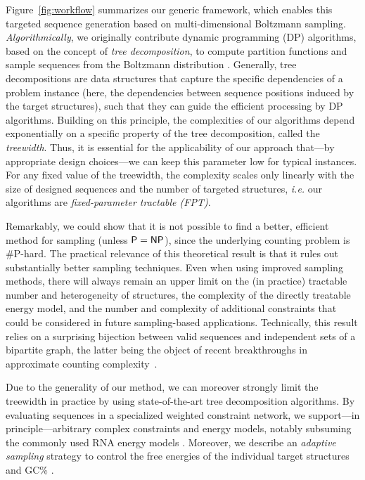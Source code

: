 \documentclass[]{bmcart}
\newcommand{\Def}[1]{\emph{#1}}
\newcommand{\Nuc}[1]{{\sf #1}}
\newcommand{\Cb}{\Nuc{C}}
\newcommand{\Gb}{\Nuc{G}}
\newcommand{\GCb}{\Gb\Cb}
\newcommand{\citep}[1]{\cite{#1}}
\newcommand{\revised}[1]{{\color{red} #1}}
\begin{document}
\revised{Figure~\ref{fig:workflow} summarizes our generic framework, which enables this targeted sequence generation based on multi-dimensional Boltzmann sampling. \emph{Algorithmically}, we originally contribute} dynamic programming (DP) algorithms, based on the concept of \Def{tree decomposition}, to compute partition functions and sample sequences from the Boltzmann distribution%
.
\revised{Generally, tree decompositions are data structures that capture the specific dependencies of a problem instance (here, the dependencies between sequence positions induced by the target structures), such that they can guide the efficient processing by DP algorithms.}
%
\revised{Building on this principle, the complexities of our algorithms depend exponentially on a specific property of the tree decomposition, called the \Def{treewidth}. Thus, it is essential for the applicability of our approach that---by appropriate design choices---we can keep this parameter low for typical instances. For} any fixed value of the treewidth, the complexity scales only linearly with the size of designed sequences and the number of targeted structures, \emph{i.e.} our algorithms are \emph{fixed-parameter tractable (FPT)}.

\revised{Remarkably, we could show that it is not possible to find a better, efficient method for sampling (unless ${\sf P}={\sf NP}$), since the underlying counting problem is \#{\sf P}-hard. The practical relevance of this theoretical result is that it rules out substantially better sampling techniques. Even when using improved sampling methods, there will always remain an upper limit on the (in practice) tractable number and heterogeneity of structures, the complexity of the directly treatable energy model, and the number and complexity of additional constraints that could be considered in future sampling-based applications.} Technically, this result relies on a surprising bijection between valid sequences and independent sets of a bipartite graph, the latter being the object of recent breakthroughs in approximate counting complexity~\citep{Bulatov2013,Cai2016}.

%
Due to the generality of our method, we can moreover strongly limit \revised{the treewidth} in practice by using state-of-the-art tree decomposition algorithms.
By evaluating sequences in a specialized weighted constraint
network, we support---in principle---arbitrary \revised{complex constraints and energy models},
notably subsuming the commonly
used RNA energy models%
.  Moreover, we describe an \Def{adaptive
  sampling} strategy to control the free energies of the individual
target structures and \GCb\%%
. %
\end{document}
